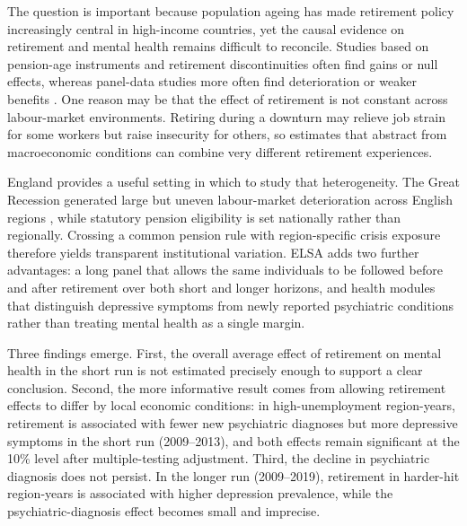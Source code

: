 \documentclass[arguments, manuscript, 11pt]{aastex631}
\begin{document}
The question is important because population ageing has made retirement policy increasingly central in high-income countries, yet the causal evidence on retirement and mental health remains difficult to reconcile. Studies based on pension-age instruments and retirement discontinuities often find gains or null effects, whereas panel-data studies more often find deterioration or weaker benefits \citep{bound2007estimating, neuman2008quit, bonsang2012retirement, coe2011retirement, eibich2015understanding, rose2020retirement, ebeid2023short, carrino2020later}. One reason may be that the effect of retirement is not constant across labour-market environments. Retiring during a downturn may relieve job strain for some workers but raise insecurity for others, so estimates that abstract from macroeconomic conditions can combine very different retirement experiences.

England provides a useful setting in which to study that heterogeneity. The Great Recession generated large but uneven labour-market deterioration across English regions \citep{bell2010uk, jofre2018impact}, while statutory pension eligibility is set nationally rather than regionally. Crossing a common pension rule with region-specific crisis exposure therefore yields transparent institutional variation. ELSA adds two further advantages: a long panel that allows the same individuals to be followed before and after retirement over both short and longer horizons, and health modules that distinguish depressive symptoms from newly reported psychiatric conditions rather than treating mental health as a single margin.

Three findings emerge. First, the overall average effect of retirement on mental health in the short run is not estimated precisely enough to support a clear conclusion. Second, the more informative result comes from allowing retirement effects to differ by local economic conditions: in high-unemployment region-years, retirement is associated with fewer new psychiatric diagnoses but more depressive symptoms in the short run (2009--2013), and both effects remain significant at the 10\% level after multiple-testing adjustment. Third, the decline in psychiatric diagnosis does not persist. In the longer run (2009--2019), retirement in harder-hit region-years is associated with higher depression prevalence, while the psychiatric-diagnosis effect becomes small and imprecise.
\end{document}
